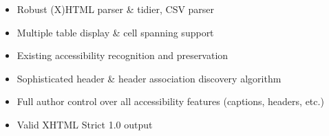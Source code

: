 \documentclass[landscape,20pt]{foils}
\newcommand{\jhead}[1]{\foilhead{\flushleft \textcolor{blue}{\large   #1}
\vspace{-1.9cm} 
\textcolor{blue}{\rule{25cm}{0.5mm}}
}}
\begin{document}

\begin{itemize}

\item Robust (X)HTML parser \& tidier, CSV parser

\item Multiple table display \& cell spanning support

\item Existing accessibility recognition and preservation

\item Sophisticated header \& header association discovery algorithm

\item Full author control over all accessibility features (captions, headers, etc.)

\item Valid XHTML Strict 1.0 output

\end{itemize}




\jhead{Demonstration}

\setcounter{page}{6}







\jhead{Conclusion}

\setcounter{page}{7}
\end{document}
